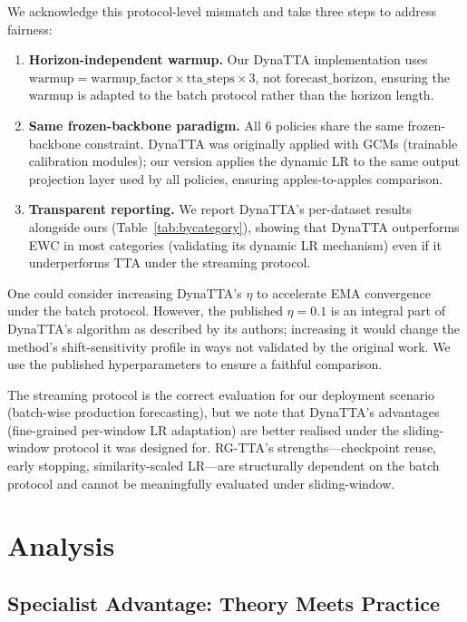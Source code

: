 \documentclass[journal]{IEEEtran}
\begin{document}
We acknowledge this protocol-level mismatch and take three steps to address fairness:

\begin{enumerate}[nosep]
  \item \textbf{Horizon-independent warmup.} Our DynaTTA implementation uses $\text{warmup} = \text{warmup\_factor} \times \text{tta\_steps} \times 3$, not $\text{forecast\_horizon}$, ensuring the warmup is adapted to the batch protocol rather than the horizon length.
  \item \textbf{Same frozen-backbone paradigm.} All 6 policies share the same frozen-backbone constraint. DynaTTA was originally applied with GCMs (trainable calibration modules); our version applies the dynamic LR to the same output projection layer used by all policies, ensuring apples-to-apples comparison.
  \item \textbf{Transparent reporting.} We report DynaTTA's per-dataset results alongside ours (Table~\ref{tab:bycategory}), showing that DynaTTA outperforms EWC in most categories (validating its dynamic LR mechanism) even if it underperforms TTA under the streaming protocol.
\end{enumerate}

One could consider increasing DynaTTA's $\eta$ to accelerate EMA convergence under the batch protocol. However, the published $\eta=0.1$ is an integral part of DynaTTA's algorithm as described by its authors; increasing it would change the method's shift-sensitivity profile in ways not validated by the original work. We use the published hyperparameters to ensure a faithful comparison.

The streaming protocol is the correct evaluation for our deployment scenario (batch-wise production forecasting), but we note that DynaTTA's advantages (fine-grained per-window LR adaptation) are better realised under the sliding-window protocol it was designed for. RG-TTA's strengths---checkpoint reuse, early stopping, similarity-scaled LR---are structurally dependent on the batch protocol and cannot be meaningfully evaluated under sliding-window.


\FloatBarrier
\section{Analysis}
\label{sec:analysis}

\subsection{Specialist Advantage: Theory Meets Practice}
\end{document}
